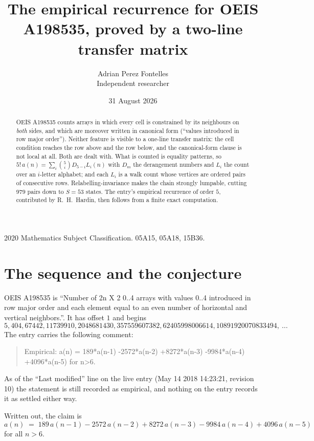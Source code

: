 \documentclass[11pt,a4paper]{article}
\title{The empirical recurrence for OEIS A198535, proved by a two-line transfer matrix}
\author{Adrian Perez Fontelles\\ \small Independent researcher}
\date{31 August 2026}
\theoremstyle{plain}
\theoremstyle{definition}
\begin{document}
\maketitle

\begin{abstract}
OEIS A198535 counts arrays in which every cell is constrained by its neighbours on \emph{both}
sides, and which are moreover written in canonical form (``values introduced in row major
order''). Neither feature is visible to a one-line transfer matrix: the cell condition
reaches the row above and the row below, and the canonical-form clause is not local at
all. Both are dealt with. What is counted is equality patterns, so
$5!\,a(n)=\sum_i\binom{5}{i}D_{5-i}L_i(n)$ with $D_m$ the derangement numbers and
$L_i$ the count over an $i$-letter alphabet; and each $L_i$ is a walk count whose vertices
are ordered pairs of consecutive rows. Relabelling-invariance makes the chain strongly
lumpable, cutting $979$ pairs down to $S=53$ states. The entry's empirical recurrence of
order $5$, contributed by R.~H.~Hardin, then follows from a finite exact computation.
\end{abstract}

\noindent\small 2020 Mathematics Subject Classification. 05A15, 05A18, 15B36.\normalsize

\section{The sequence and the conjecture}

OEIS A198535 is ``Number of 2n X 2 0..4 arrays with values 0..4 introduced in row major order and each element equal to an even number of horizontal and vertical neighbors.''. It has offset $1$ and begins
\[
5, 404, 67442, 11739910, 2048681430, 357559607382, 62405998006614, 10891920070833494,\ \dots
\]
The entry carries the following comment:
\begin{quote}\small
Empirical: a(n) = 189*a(n-1) -2572*a(n-2) +8272*a(n-3) -9984*a(n-4) +4096*a(n-5) for n>6.
\end{quote}
As of the ``Last modified'' line on the live entry (May 14 2018 14:23:21, revision 10) the statement is
still recorded as empirical, and nothing on the entry records it as settled either way.

Written out, the claim is
\begin{equation}\label{eq:conj}
a(n)\;=\;189\,a(n-1) - 2572\,a(n-2) + 8272\,a(n-3) - 9984\,a(n-4) + 4096\,a(n-5)
\end{equation}
for all $n>6$.
\end{document}
